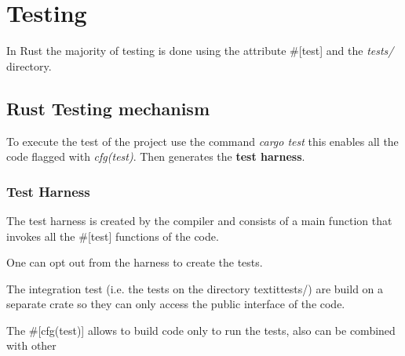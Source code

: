 \section{Testing}

In Rust the majority of testing is done using the attribute \#[test] and the \textit{tests/} directory.

\subsection{Rust Testing mechanism}

To execute the test of the project use the command \textit{cargo test} this enables all the code flagged with \textit{cfg(test)}.
Then generates the \textbf{test harness}.

\subsubsection{Test Harness}

The test harness is created by the compiler and consists of a main function that invokes all the \#[test] functions of the code.

One can opt out from the harness to create the tests.

The integration test (i.e. the tests on the directory textit{tests/}) are build on a separate crate so they can only access the public interface of the code.

The \#[cfg(test)] allows to build code only to run the tests, also can be combined with other
